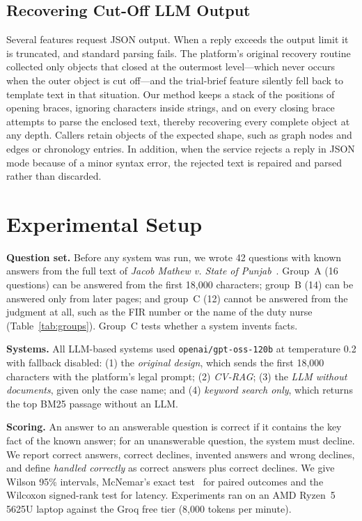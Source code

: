 \documentclass[conference]{IEEEtran}
\begin{document}
\subsection{Recovering Cut-Off LLM Output}
Several features request JSON output. When a reply exceeds the output limit it is truncated, and standard parsing fails. The platform's original recovery routine collected only objects that closed at the outermost level---which never occurs when the outer object is cut off---and the trial-brief feature silently fell back to template text in that situation. Our method keeps a stack of the positions of opening braces, ignoring characters inside strings, and on every closing brace attempts to parse the enclosed text, thereby recovering every complete object at any depth. Callers retain objects of the expected shape, such as graph nodes and edges or chronology entries. In addition, when the service rejects a reply in JSON mode because of a minor syntax error, the rejected text is repaired and parsed rather than discarded.

\section{Experimental Setup}
\textbf{Question set.} Before any system was run, we wrote 42 questions with known answers from the full text of \emph{Jacob Mathew v. State of Punjab}~\cite{jacobmathew2005}. Group~A (16 questions) can be answered from the first 18,000 characters; group~B (14) can be answered only from later pages; and group~C (12) cannot be answered from the judgment at all, such as the FIR number or the name of the duty nurse (Table~\ref{tab:groups}). Group~C tests whether a system invents facts.

\textbf{Systems.} All LLM-based systems used \texttt{openai/gpt-oss-120b} at temperature 0.2 with fallback disabled: (1) the \emph{original design}, which sends the first 18,000 characters with the platform's legal prompt; (2) \emph{CV-RAG}; (3) the \emph{LLM without documents}, given only the case name; and (4) \emph{keyword search only}, which returns the top BM25 passage without an LLM.

\textbf{Scoring.} An answer to an answerable question is correct if it contains the key fact of the known answer; for an unanswerable question, the system must decline. We report correct answers, correct declines, invented answers and wrong declines, and define \emph{handled correctly} as correct answers plus correct declines. We give Wilson 95\% intervals, McNemar's exact test~\cite{mcnemar1947} for paired outcomes and the Wilcoxon signed-rank test for latency. Experiments ran on an AMD Ryzen~5 5625U laptop against the Groq free tier (8,000 tokens per minute).
\end{document}
